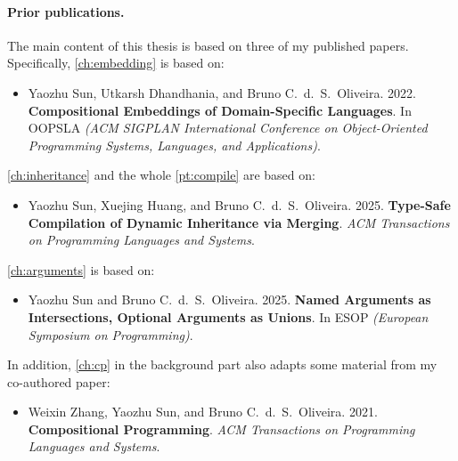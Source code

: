 \paragraph{Prior publications.}
The main content of this thesis is based on three of my published papers.
Specifically, \autoref{ch:embedding} is based on:
\begin{itemize}
\item Yaozhu Sun, Utkarsh Dhandhania, and Bruno C.~d.~S.~Oliveira. 2022.
\textbf{Compositional Embeddings of Domain-Specific Languages}. In OOPSLA
\textit{(ACM SIGPLAN International Conference on Object-Oriented Programming
Systems, Languages, and Applications)}.
\end{itemize}
\autoref{ch:inheritance} and the whole \autoref{pt:compile} are based on:
\begin{itemize}
\item Yaozhu Sun, Xuejing Huang, and Bruno C.~d.~S.~Oliveira. 2025.
\textbf{Type-Safe Compilation of Dynamic Inheritance via Merging}.
\textit{ACM Transactions on Programming Languages and Systems}.
\end{itemize}
\autoref{ch:arguments} is based on:
\begin{itemize}
\item Yaozhu Sun and Bruno C.~d.~S.~Oliveira. 2025.
\textbf{Named Arguments as Intersections, Optional Arguments as Unions}.
In ESOP \textit{(European Symposium on Programming)}.
\end{itemize}
In addition, \autoref{ch:cp} in the background part also adapts some material
from my co-authored paper:
\begin{itemize}
\item Weixin Zhang, Yaozhu Sun, and Bruno C.~d.~S.~Oliveira. 2021.
\textbf{Compositional Programming}. \textit{ACM Transactions on Programming
Languages and Systems}.
\end{itemize}
